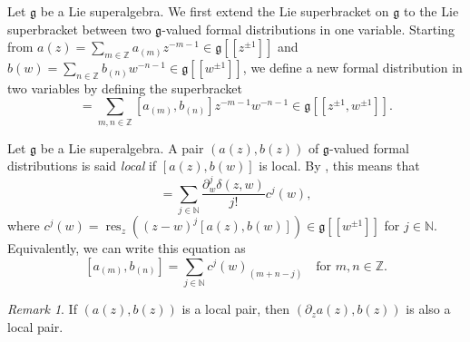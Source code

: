 \documentclass[a4paper, 12pt, reqno]{amsart}
\theoremstyle{remark}
\newtheorem{remark}[theorem]{Remark}
\DeclareMathOperator{\res}{res}
\begin{document}
Let $\mathfrak{g}$ be a Lie superalgebra.
We first extend the Lie superbracket on $\mathfrak{g}$ to the Lie superbracket between two $\mathfrak{g}$-valued formal distributions in one variable.
Starting from $a(z) = \sum_{m \in \mathbb{Z}}a_{(m)}z^{-m - 1} \in \mathfrak{g}[[z^{\pm 1}]]$ and $b(w) = \sum_{n \in \mathbb{Z}}b_{(n)}w^{-n - 1} \in \mathfrak{g}[[w^{\pm 1}]]$, we define a new formal distribution in two variables by defining the superbracket
\begin{equation*}
  [a(z), b(w)] = \sum_{m, n \in \mathbb{Z}}[a_{(m)}, b_{(n)}]z^{-m - 1}w^{-n - 1} \in \mathfrak{g}[[z^{\pm 1}, w^{\pm 1}]].
\end{equation*}

Let $\mathfrak{g}$ be a Lie superalgebra.
A pair $(a(z), b(z))$ of $\mathfrak{g}$-valued formal distributions is said \emph{local} if $[a(z), b(w)]$ is local.
By , this means that
\begin{equation*}
  [a(z), b(w)] = \sum_{j \in \mathbb{N}}\frac{\partial^j_w\delta(z, w)}{j!}c^j(w),
\end{equation*}
where $c^j(w) = \res_z((z - w)^j[a(z), b(w)]) \in \mathfrak{g}[[w^{\pm 1}]]$ for $j \in \mathbb{N}$.
Equivalently, we can write this equation as
\begin{equation}
  \label{eq:1}
  [a_{(m)}, b_{(n)}] = \sum_{j \in \mathbb{N}}c^j(w)_{(m + n - j)} \quad \text{for $m, n \in \mathbb{Z}$}.
\end{equation}

\begin{remark}
  \label{rmk:4}
  If $(a(z), b(z))$ is a local pair, then $(\partial_za(z), b(z))$ is also a local pair.
\end{remark}
\end{document}
